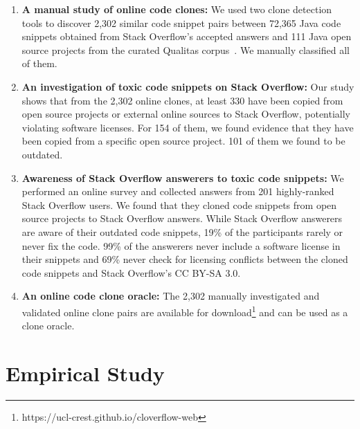 \documentclass[10pt,journal,compsoc]{IEEEtran}
\begin{document}
\begin{enumerate} 
	\item \textbf{A manual study of online code clones:} We used
	two clone detection tools to discover 2,302 similar code snippet pairs between
	72,365 Java code snippets obtained from Stack Overflow's accepted answers and
	111 Java open source projects from the curated Qualitas
	corpus~\cite{QualitasCorpus}. We manually
	classified all of them.
	
	\item \textbf{An investigation of toxic code snippets on Stack Overflow:} Our study shows that from
	the 2,302 online clones, at least 330 have been copied from open source
	projects or external online sources to Stack Overflow, potentially violating
	software licenses. For 154 of them, we found evidence that they have been copied
	from a specific open source project. 101 of them we found to be outdated. %
	
	\item \textbf{Awareness of Stack Overflow answerers to toxic code snippets:} We
	performed an online survey and collected answers from 201 highly-ranked Stack
	Overflow users. We found that they cloned code snippets from open source
	projects to Stack Overflow answers. While Stack Overflow answerers are aware of
	their outdated code snippets, 19\% of the participants rarely
	or never fix the code. 99\% of the answerers never include a software
	license in their snippets and 69\% never check for licensing conflicts between the
	cloned code snippets and Stack Overflow's CC BY-SA 3.0.
	
	\item \textbf{An online code
		clone oracle:} The 2,302 manually investigated and validated online clone pairs
	are available for download\footnote{https://ucl-crest.github.io/cloverflow-web} and
	can be used as a clone oracle. \end{enumerate}

\section{Empirical Study}
\end{document}
